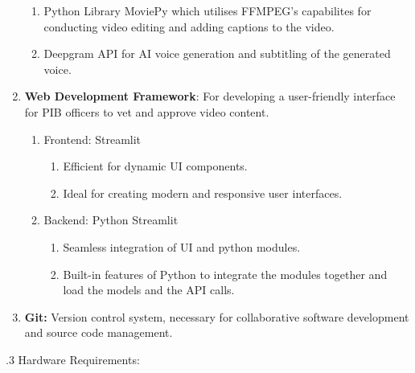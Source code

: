\documentclass[12pt]{article}
\begin{document}
\begin{enumerate}
\begin{enumerate}
        \item Python Library MoviePy which utilises FFMPEG's capabilites for conducting video editing and adding captions to the video.
        \item Deepgram API for AI voice generation and subtitling of the generated voice.
    \end{enumerate}
\item
  \textbf{Web Development Framework}: For developing a user-friendly interface for PIB officers to vet and approve video content.
    \begin{enumerate}
        \item Frontend: Streamlit
            \begin{enumerate}
                \item Efficient for dynamic UI components.
                \item Ideal for creating modern and responsive user interfaces.
            \end{enumerate}
        \item Backend: Python Streamlit
            \begin{enumerate}
                \item Seamless integration of UI and python modules.
                \item Built-in features of Python to integrate the modules together and load the models and the API calls.
            \end{enumerate}
    \end{enumerate}
\item
  \textbf{Git:} Version control system, necessary for collaborative
  software development and source code management.
\end{enumerate}

.3 Hardware Requirements:
\end{document}

